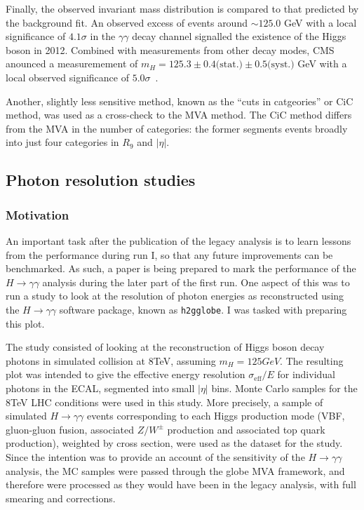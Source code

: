 \documentclass[10pt]{article}
\begin{document}
Finally, the observed invariant mass distribution is compared to that predicted by the background fit. An observed excess of events around $\sim125.0$ GeV with a local significance of $4.1 \sigma$ in the $\gamma \gamma$ decay channel signalled the existence of the Higgs boson in 2012. Combined with measurements from other decay modes, CMS anounced a measuremement of $m_H=125.3 \pm 0.4 \text{(stat.)} \pm 0.5 \text{(syst.)}$ GeV with a local observed significance of $5.0 \sigma$~\cite{HDisc}.

Another, slightly less sensitive method, known as the ``cuts in catgeories'' or CiC method, was used as a cross-check to the MVA method. The CiC method differs from the MVA in the number of categories: the former segments events broadly into just four categories in $R_9$ and $|\eta|$.

\subsection{Photon resolution studies}

\subsubsection{Motivation}

An important task after the publication of the legacy analysis is to learn lessons from the performance during run I, so that any future improvements can be benchmarked. As such, a paper is being prepared to mark the performance of the $H \rightarrow \gamma\gamma$ analysis during the later part of the first run. One aspect of this was to run a study to look at the resolution of photon energies as reconstructed using the $H \rightarrow \gamma\gamma$ software package, known as \texttt{h2gglobe}. I was tasked with preparing this plot.

The study consisted of looking at the reconstruction of Higgs boson decay photons in simulated collision at 8TeV, assuming $m_H = 125GeV$. The resulting plot was intended to give the effective energy resolution $\sigma_{\text{eff}}/E$ for individual photons in the ECAL, segmented into small $|\eta|$ bins.
Monte Carlo samples for the $8$TeV LHC conditions were used in this study. More precisely, a sample of simulated $H \rightarrow \gamma \gamma$ events corresponding to each Higgs production mode (VBF, gluon-gluon fusion, associated $Z/W^{\pm}$ production and associated top quark production), weighted by cross section, were used as the dataset for the study.
Since the intention was to provide an account of the sensitivity of the $H \rightarrow \gamma\gamma$ analysis, the MC samples were passed through the globe MVA framework, and therefore were processed as they would have been in the legacy analysis, with full smearing and corrections.
\end{document}
